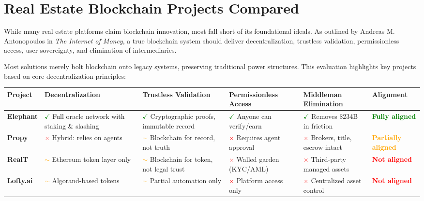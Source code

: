 \newpage
\chapter{Real Estate Blockchain Projects Compared}
While many real estate platforms claim blockchain innovation, most fall short of its foundational ideals. As outlined by Andreas M. Antonopoulos in \textit{The Internet of Money}, a true blockchain system should deliver decentralization, trustless validation, permissionless access, user sovereignty, and elimination of intermediaries.

Most solutions merely bolt blockchain onto legacy systems, preserving traditional power structures. This evaluation highlights key projects based on core decentralization principles:

\begin{table}[H]
\centering
\scriptsize
\renewcommand{\arraystretch}{1.2}
\begin{tabular}{|p{1.4cm}|p{2.3cm}|p{2.3cm}|p{2.3cm}|p{2.3cm}|p{1.8cm}|}
\hline
\textbf{Project} & \textbf{Decentralization} & \textbf{Trustless Validation} & \textbf{Permissionless Access} & \textbf{Middleman Elimination} & \textbf{Alignment} \\
\hline
\textbf{Elephant} & 
\textcolor{green}{$\checkmark$} Full oracle network with staking \& slashing & 
\textcolor{green}{$\checkmark$} Cryptographic proofs, immutable record & 
\textcolor{green}{$\checkmark$} Anyone can verify/earn & 
\textcolor{green}{$\checkmark$} Removes \$234B in friction & 
\textcolor{green}{\textbf{Fully aligned}} \\
\hline
\textbf{Propy} & 
\textcolor{red}{$\times$} Hybrid: relies on agents & 
\textcolor{orange}{$\sim$} Blockchain for record, not truth & 
\textcolor{red}{$\times$} Requires agent approval & 
\textcolor{red}{$\times$} Brokers, title, escrow intact & 
\textcolor{orange}{\textbf{Partially aligned}} \\
\hline
\textbf{RealT} & 
\textcolor{orange}{$\sim$} Ethereum token layer only & 
\textcolor{orange}{$\sim$} Blockchain for token, not legal trust & 
\textcolor{red}{$\times$} Walled garden (KYC/AML) & 
\textcolor{red}{$\times$} Third-party managed assets & 
\textcolor{red}{\textbf{Not aligned}} \\
\hline
\textbf{Lofty.ai} & 
\textcolor{orange}{$\sim$} Algorand-based tokens & 
\textcolor{orange}{$\sim$} Partial automation only & 
\textcolor{red}{$\times$} Platform access only & 
\textcolor{red}{$\times$} Centralized asset control & 
\textcolor{red}{\textbf{Not aligned}} \\

\end{tabular}
\end{table}
